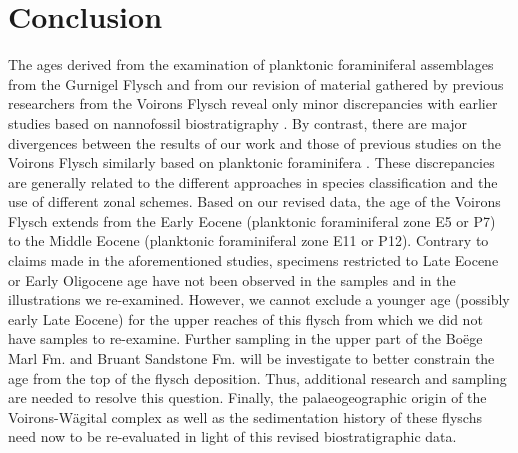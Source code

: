 \documentclass[twoside]{article}
\begin{document}

\section{Conclusion}

The ages derived from the examination of planktonic foraminiferal assemblages from the Gurnigel Flysch and from our revision of material gathered by previous researchers from the Voirons Flysch reveal only minor discrepancies with earlier studies based on nannofossil biostratigraphy \citep{JanduChene1975c,Weidmann1976a,Morel1980b,Stuijvenberg1980a,Stuijvenberg1980b}. By contrast, there are major divergences between the results of our work and those of previous studies on the Voirons Flysch similarly based on planktonic foraminifera \citep{Ujetz1996,Coppo1999,Frebourg2006,Ospina-Ostios2013,Ospina-Ostios2017}. These discrepancies are generally related to the different approaches in species classification and the use of different zonal schemes. Based on our revised data, the age of the Voirons Flysch extends from the Early Eocene (planktonic foraminiferal zone E5 or P7) to the Middle Eocene (planktonic foraminiferal zone E11 or P12). Contrary to claims made in the aforementioned studies, specimens restricted to Late Eocene or Early Oligocene age have not been observed in the samples and in the illustrations we re-examined. However, we cannot exclude a younger age (possibly early Late Eocene) for the upper reaches of this flysch from which we did not have samples to re-examine. Further sampling in the upper part of the Boëge Marl Fm. and Bruant Sandstone Fm. will be investigate to better constrain the age from the top of the flysch deposition. Thus, additional research and sampling are needed to resolve this question. Finally, the palaeogeographic origin of the Voirons-Wägital complex as well as the sedimentation history of these flyschs need now to be re-evaluated in light of this revised biostratigraphic data.
\end{document}
